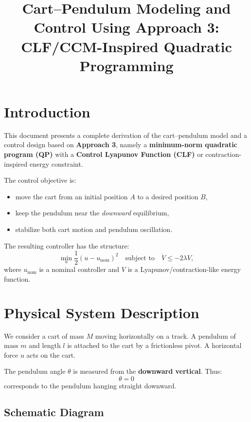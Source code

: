 \documentclass[11pt,a4paper]{article}
\title{Cart--Pendulum Modeling and Control Using Approach 3:\\
CLF/CCM-Inspired Quadratic Programming}
\author{}
\date{}
\begin{document}
\maketitle

\section{Introduction}

This document presents a complete derivation of the cart--pendulum model and a control design based on \textbf{Approach 3}, namely a \textbf{minimum-norm quadratic program (QP)} with a \textbf{Control Lyapunov Function (CLF)} or contraction-inspired energy constraint.

The control objective is:

\begin{itemize}[leftmargin=2em]
    \item move the cart from an initial position \(A\) to a desired position \(B\),
    \item keep the pendulum near the \emph{downward} equilibrium,
    \item stabilize both cart motion and pendulum oscillation.
\end{itemize}

The resulting controller has the structure:
\[
\min_{u} \frac{1}{2}(u-u_{\mathrm{nom}})^2
\quad
\text{subject to}
\quad
\dot V \le -2\lambda V,
\]
where \(u_{\mathrm{nom}}\) is a nominal controller and \(V\) is a Lyapunov/contraction-like energy function.

\section{Physical System Description}

We consider a cart of mass \(M\) moving horizontally on a track. A pendulum of mass \(m\) and length \(l\) is attached to the cart by a frictionless pivot. A horizontal force \(u\) acts on the cart.

The pendulum angle \(\theta\) is measured from the \textbf{downward vertical}. Thus:
\[
\theta = 0
\]
corresponds to the pendulum hanging straight downward.

\subsection{Schematic Diagram}
\end{document}
